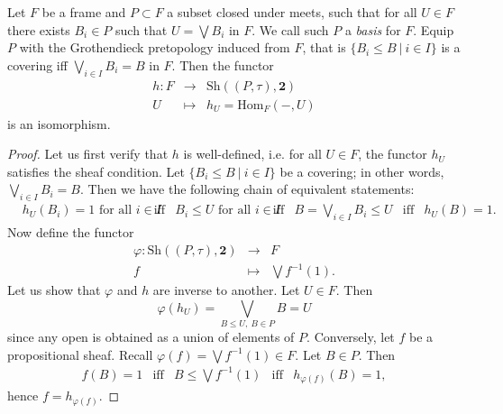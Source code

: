 \documentclass[10pt,a4paper]{amsart}
\begin{document}
\begin{proposition} \label{basistheorem}
Let $F$ be a frame and $P \subset F$ a subset closed under meets, such that for all $U \in F$ there exists $B_i \in P$ such that $U = \bigvee B_i$ in $F$. We call such $P$ a \emph{basis} for $F$.  Equip $P$ with the Grothendieck pretopology induced from $F$, that is $\{B_i \leq B ~|~ i \in I \}$ is a covering iff $\bigvee_{i \in I} B_i = B$ in $F$. Then the functor
$$\begin{array}{rcl} h : F & \rightarrow & \mathrm{Sh}((P,\tau), \mathbf{2}) \\
U & \mapsto & h_U = \mathrm{Hom}_F( -, U)
\end{array}$$
is an isomorphism.
\end{proposition}

\begin{proof}
Let us first verify that $h$ is well-defined, i.e. for all $U \in F$, the functor $h_U$ satisfies the sheaf condition. Let $\{B_i \leq B ~|~ i \in I \}$ be a covering; in other words, $\bigvee_{i \in I} B_i = B$. Then we have the following chain of equivalent statements:
\[\begin{array}{rccccccl}
 & h_U(B_i) = 1 \text{ for all } i \in I &
\text{iff} & B_i \leq U \text{ for all } i \in I &
\text{iff} & B = \bigvee_{i \in I} B_i \leq U &
\text{iff} & h_U(B) = 1.
\end{array}\]
Now define the functor
$$\begin{array}{rcl}
\varphi: \mathrm{Sh}((P,\tau), \mathbf{2}) &\rightarrow & F \\
f & \mapsto &\bigvee f^{-1}(1).
\end{array}$$
Let us show that $\varphi$ and $h$ are inverse to another. Let $U \in F$. Then 
$$\varphi(h_U) = \bigvee_{B \leq U, ~ B \in P} B = U$$
since any open is obtained as a union of elements of $P$. Conversely, let $f$ be a propositional sheaf. Recall $\varphi(f) = \bigvee f^{-1}(1) \in F$. 
Let $B \in P$. Then 
\[\begin{array}{rcccl}
f(B) = 1 &
\text{iff} & B \leq \bigvee f^{-1}(1) &
\text{iff} & h_{\varphi(f)}(B) = 1,
\end{array}\]
hence $f = h_{\varphi(f)}$.
\end{proof}
\end{document}
